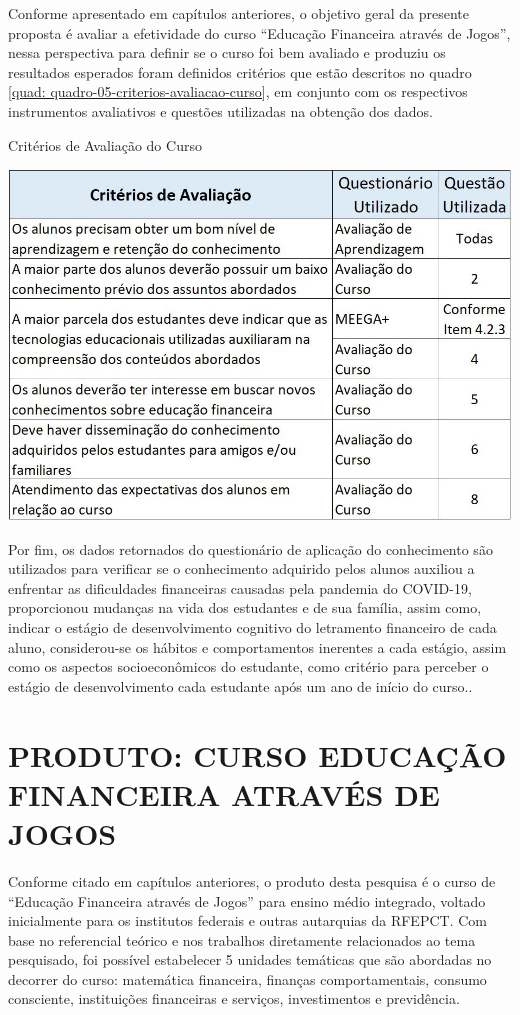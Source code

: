 Conforme apresentado em capítulos anteriores, o objetivo geral da presente proposta é avaliar a efetividade do curso “Educação Financeira através de Jogos”, nessa perspectiva para definir se o curso foi bem avaliado e produziu os resultados esperados foram definidos critérios que estão descritos no quadro \ref{quad: quadro-05-criterios-avaliacao-curso}, em conjunto com os respectivos instrumentos avaliativos e questões utilizadas na obtenção dos dados.

\graphicspath{{quadros/}} 
\begin{quadro}[!ht]
\centering
\begin{minipage}{0.8\textwidth}
\caption{Critérios de Avaliação do Curso}
\centering
\includegraphics[width=1.0\textwidth]{quadro-05-criterios-avaliacao-curso}
\label{quad: quadro-05-criterios-avaliacao-curso}
\end{minipage}
\end{quadro}
\newpage
Por fim, os dados retornados do questionário de aplicação do conhecimento são utilizados para verificar se o conhecimento adquirido pelos alunos auxiliou a enfrentar as dificuldades financeiras causadas pela pandemia do COVID-19, proporcionou mudanças na vida dos estudantes e de sua família, assim como, indicar o estágio de desenvolvimento cognitivo do letramento financeiro de cada aluno, considerou-se os hábitos e comportamentos inerentes a cada estágio, assim como os aspectos socioeconômicos do estudante, como critério para perceber o estágio de desenvolvimento cada estudante após um ano de início do curso..

\chapter{PRODUTO: CURSO EDUCAÇÃO FINANCEIRA ATRAVÉS DE JOGOS}
Conforme citado em capítulos anteriores, o produto desta pesquisa é o curso de “Educação Financeira através de Jogos” para ensino médio integrado, voltado inicialmente para os institutos federais e outras autarquias da RFEPCT. Com base no referencial teórico e nos trabalhos diretamente relacionados ao tema pesquisado, foi possível estabelecer 5 unidades temáticas que são abordadas no decorrer do curso: matemática financeira, finanças comportamentais, consumo consciente, instituições financeiras e serviços, investimentos e previdência.

